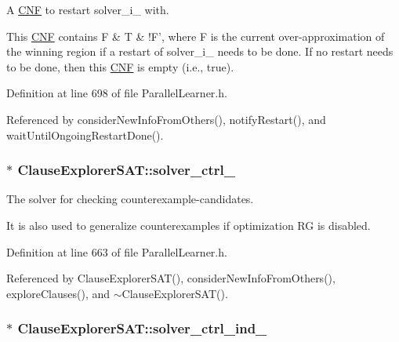 A \hyperlink{classCNF}{C\-N\-F} to restart solver\-\_\-i\-\_\- with. 

This \hyperlink{classCNF}{C\-N\-F} contains F \& T \& !\-F', where F is the current over-\/approximation of the winning region if a restart of solver\-\_\-i\-\_\- needs to be done. If no restart needs to be done, then this \hyperlink{classCNF}{C\-N\-F} is empty (i.\-e., true). 

Definition at line 698 of file Parallel\-Learner.\-h.



Referenced by consider\-New\-Info\-From\-Others(), notify\-Restart(), and wait\-Until\-Ongoing\-Restart\-Done().

\hypertarget{classClauseExplorerSAT_a7884d171120e8397140e30fdc28767eb}{
\subsubsection[{solver\-\_\-ctrl\-\_\-}]{$\ast$ Clause\-Explorer\-S\-A\-T\-::solver\-\_\-ctrl\-\_\-\hspace{0.3cm}{\ttfamily [protected]}}}\label{classClauseExplorerSAT_a7884d171120e8397140e30fdc28767eb}


The solver for checking counterexample-\/candidates. 

It is also used to generalize counterexamples if optimization R\-G is disabled. 

Definition at line 663 of file Parallel\-Learner.\-h.



Referenced by Clause\-Explorer\-S\-A\-T(), consider\-New\-Info\-From\-Others(), explore\-Clauses(), and $\sim$\-Clause\-Explorer\-S\-A\-T().

\hypertarget{classClauseExplorerSAT_aba4c9ed8ccc28d89c094f3cd80157f3f}{
\subsubsection[{solver\-\_\-ctrl\-\_\-ind\-\_\-}]{$\ast$ Clause\-Explorer\-S\-A\-T\-::solver\-\_\-ctrl\-\_\-ind\-\_\-\hspace{0.3cm}{\ttfamily [protected]}}}\label{classClauseExplorerSAT_aba4c9ed8ccc28d89c094f3cd80157f3f}


